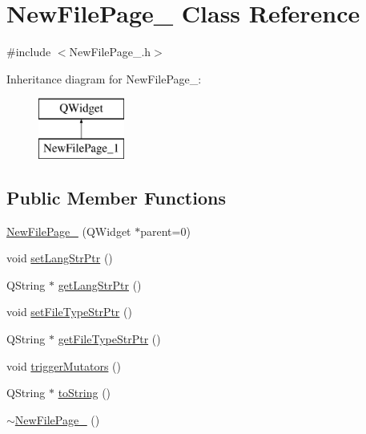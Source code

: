 \hypertarget{class_new_file_page__1}{\section{New\-File\-Page\-\_ Class Reference}
\label{class_new_file_page__1}
}


{\ttfamily \#include $<$New\-File\-Page\-\_.\-h$>$}

Inheritance diagram for New\-File\-Page\-\_\-:\begin{figure}[H]
\begin{center}
\leavevmode
\includegraphics[height=2.000000cm]{class_new_file_page__1}
\end{center}
\end{figure}
\subsection*{Public Member Functions}
\begin{DoxyCompactItemize}
\item 
\hyperlink{class_new_file_page__1_ad79384836bb84e907b49d4bf6ccbebaf}{New\-File\-Page\-\_} (Q\-Widget $\ast$parent=0)
\item 
void \hyperlink{class_new_file_page__1_aedb155a9cc29ed45603544e7de9f0179}{set\-Lang\-Str\-Ptr} ()
\item 
Q\-String $\ast$ \hyperlink{class_new_file_page__1_aaf195fbe5a34973ed0e65f4cafc276f4}{get\-Lang\-Str\-Ptr} ()
\item 
void \hyperlink{class_new_file_page__1_a3823895d19c55de9b7865299f1d85a25}{set\-File\-Type\-Str\-Ptr} ()
\item 
Q\-String $\ast$ \hyperlink{class_new_file_page__1_a3113674205e78514901da898e4d6f748}{get\-File\-Type\-Str\-Ptr} ()
\item 
void \hyperlink{class_new_file_page__1_a670bb1f3c278c7c27cd7747d2e3906cc}{trigger\-Mutators} ()
\item 
Q\-String $\ast$ \hyperlink{class_new_file_page__1_a568799ae8fd3fcbf4217c2d2af250fdd}{to\-String} ()
\item 
\hyperlink{class_new_file_page__1_a3179b495b36c69da575e95e05fd59264}{$\sim$\-New\-File\-Page\-\_} ()
\end{DoxyCompactItemize}
